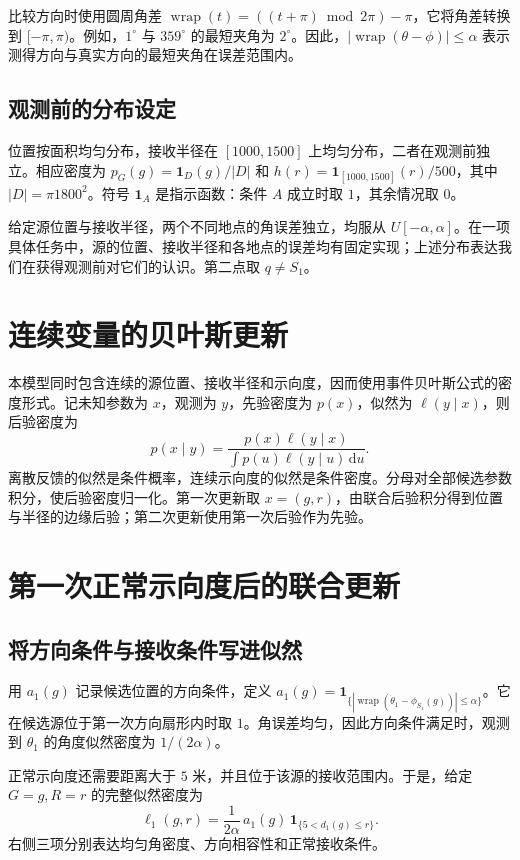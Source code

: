 \documentclass[UTF8,a4paper,zihao=-4,fontset=none]{ctexart}
\numberwithin{equation}{section}
\newcommand{\ind}{\mathbf 1}
\newcommand{\dd}{\,\mathrm d}
\newcommand{\wrap}{\operatorname{wrap}}
\begin{document}
比较方向时使用圆周角差 \(\wrap(t)=((t+\pi)\bmod2\pi)-\pi\)，它将角差转换到 \([-\pi,\pi)\)。例如，\(1^\circ\) 与 \(359^\circ\) 的最短夹角为 \(2^\circ\)。因此，\(|\wrap(\theta-\phi)|\le\alpha\) 表示测得方向与真实方向的最短夹角在误差范围内。

\subsection{观测前的分布设定}
位置按面积均匀分布，接收半径在 \([1000,1500]\) 上均匀分布，二者在观测前独立。相应密度为 \(p_G(g)=\ind_D(g)/|D|\) 和 \(h(r)=\ind_{[1000,1500]}(r)/500\)，其中 \(|D|=\pi1800^2\)。符号 \(\ind_A\) 是指示函数：条件 \(A\) 成立时取 \(1\)，其余情况取 \(0\)。

给定源位置与接收半径，两个不同地点的角误差独立，均服从 \(U[-\alpha,\alpha]\)。在一项具体任务中，源的位置、接收半径和各地点的误差均有固定实现；上述分布表达我们在获得观测前对它们的认识。第二点取 \(q\ne S_1\)。

\section{连续变量的贝叶斯更新}
本模型同时包含连续的源位置、接收半径和示向度，因而使用事件贝叶斯公式的密度形式。记未知参数为 \(x\)，观测为 \(y\)，先验密度为 \(p(x)\)，似然为 \(\ell(y\mid x)\)，则后验密度为
\begin{equation}\label{eq:bayes}
p(x\mid y)=\frac{p(x)\ell(y\mid x)}{\int p(u)\ell(y\mid u)\dd u}.
\end{equation}
离散反馈的似然是条件概率，连续示向度的似然是条件密度。分母对全部候选参数积分，使后验密度归一化。第一次更新取 \(x=(g,r)\)，由联合后验积分得到位置与半径的边缘后验；第二次更新使用第一次后验作为先验。

\section{第一次正常示向度后的联合更新}
\subsection{将方向条件与接收条件写进似然}
用 \(a_1(g)\) 记录候选位置的方向条件，定义 \(a_1(g)=\ind_{\{|\wrap(\theta_1-\phi_{S_1}(g))|\le\alpha\}}\)。它在候选源位于第一次方向扇形内时取 \(1\)。角误差均匀，因此方向条件满足时，观测到 \(\theta_1\) 的角度似然密度为 \(1/(2\alpha)\)。

正常示向度还需要距离大于 \(5\) 米，并且位于该源的接收范围内。于是，给定 \(G=g,R=r\) 的完整似然密度为
\begin{equation}\label{eq:likelihood1}
\ell_1(g,r)=\frac{1}{2\alpha}\,a_1(g)\,\ind_{\{5<d_1(g)\le r\}}.
\end{equation}
右侧三项分别表达均匀角密度、方向相容性和正常接收条件。
\end{document}
